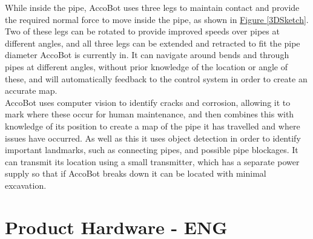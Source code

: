 \documentclass[11pt]{article}		%
\newcommand{\figref}[1]{\hyperref[#1]{Figure \ref*{#1}}}    %
\begin{document}
		While inside the pipe, AccoBot uses three legs to maintain contact and provide the required normal force to move inside the pipe, as shown in \figref{3DSketch}.
		Two of these legs can be rotated to provide improved speeds over pipes at different angles, and all three legs can be extended and retracted to fit the pipe diameter AccoBot is currently in.
		It can navigate around bends and through pipes at different angles, without prior knowledge of the location or angle of these, and will automatically feedback to the control system in order to create an accurate map.
		\\
		AccoBot uses computer vision to identify cracks and corrosion, allowing it to mark where these occur for human maintenance, and then combines this with knowledge of its position to create a map of the pipe it has travelled and where issues have occurred.
		As well as this it uses object detection in order to identify important landmarks, such as connecting pipes, and possible pipe blockages.
		It can transmit its location using a small transmitter, which has a separate power supply so that if AccoBot breaks down it can be located with minimal excavation.
	
	\section{Product Hardware - ENG}
	
\end{document}
